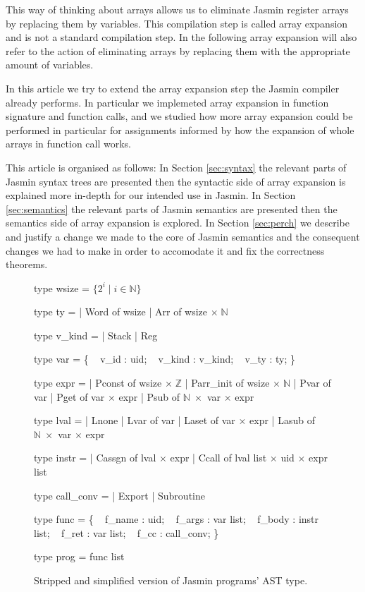 \documentclass{article}
\newcommand\setZ{\mathbb{Z}}
\newcommand\setN{\mathbb{N}}
\begin{document}
This way of thinking about arrays allows us to eliminate Jasmin register arrays
by replacing them by variables. This compilation step is called array expansion
and is not a standard compilation step. In the following array expansion will
also refer to the action of eliminating arrays by replacing them with the
appropriate amount of variables.

\medskip

In this article we try to extend the array expansion step the Jasmin compiler
already performs. In particular we implemeted array expansion in function
signature and function calls, and we studied how more array expansion could be
performed in particular for assignments informed by how the expansion of whole
arrays in function call works.


\medskip

This article is organised as follows:
In Section \ref{sec:syntax} the relevant parts of Jasmin syntax trees are
presented then the syntactic side of array expansion is explained more in-depth
for our intended use in Jasmin.
In Section \ref{sec:semantics} the relevant parts of Jasmin semantics are
presented then the semantics side of array expansion is explored.
In Section \ref{sec:perch} we describe and justify a change we made to the core
of Jasmin semantics and the consequent changes we had to make in order to
accomodate it and fix the correctness theorems.

\begin{figure}[t]
\obeylines\obeyspaces\ttfamily%
\begin{minipage}{0.45\textwidth}
type wsize = \(\{ 2^i \mid i \in \setN \}\)

type ty =
| Word of wsize
| Arr  of wsize \(\times\;\setN\)

type v\_kind =
| Stack
| Reg

type var = \{
~ v\_id   : uid;
~ v\_kind : v\_kind;
~ v\_ty   : ty;
\}

type expr =
| Pconst    of wsize \(\times\;\setZ\)
| Parr\_init of wsize \(\times\;\setN\)
| Pvar      of var
| Pget      of var \(\times\) expr
| Psub      of \(\setN\;\times\) var \(\times\) expr
\end{minipage}\hfill\vline\hfill\begin{minipage}{0.5\textwidth}
type lval =
| Lnone
| Lvar  of var
| Laset of var \(\times\) expr
| Lasub of \(\setN\;\times\) var \(\times\) expr

type instr =
| Cassgn of lval \(\times\) expr
| Ccall  of lval list \(\times\) uid \(\times\) expr list

type call\_conv =
| Export
| Subroutine

type func = \{
~ f\_name : uid;
~ f\_args : var list;
~ f\_body : instr list;
~ f\_ret  : var list;
~ f\_cc   : call\_conv;
\}

type prog = func list
\end{minipage}\normalfont%
\caption{Stripped and simplified version of Jasmin programs' AST type.}\label{fig:types}
\end{figure}
\end{document}
